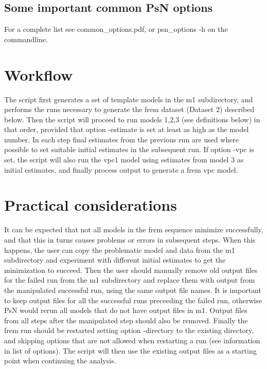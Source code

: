 \subsection{Some important common PsN options}
For a complete list see common\_options.pdf, 
or psn\_options -h on the commandline.



\section{Workflow}
The script first generates a set of template models in the m1 subdirectory, and performs the runs necessary to generate
the frem dataset (Dataset 2) described below. Then the script will proceed to run models 1,2,3 (see definitions below) 
in that order, provided
that option -estimate is set at least as high as the model number. In each step final estimates from the previous run are
used where possible to set suitable initial estimates in the subsequent run. If option -vpc is set, the script will also 
run the vpc1 model using estimates from model 3 as initial estimates, and finally process output to generate a frem vpc model.

\section{Practical considerations}
It can be expected that not all models in the frem sequence minimize successfully, and that this in turns 
causes problems or errors in subsequent steps. 
When this happens, the user can copy the problematic model and data from the m1 subdirectory and experiment with
different initial estimates to get the minimization to succeed. Then the user should manually remove old output files for the
failed run from the m1 subdirectory and replace them with output from the manipulated successful run, using the same 
output file names. It is important to keep output files for all the successful runs preceeding the failed run, 
otherwise PsN would rerun all models that do not have output files
in m1. Output files from all steps after the manipulated step should also be removed.
Finally the frem run should be restarted setting option -directory to the existing directory, and skipping 
options that are not allowed when restarting a run (see information in list of options). The script
will then use the existing output files as a starting point when continuing the analysis.


